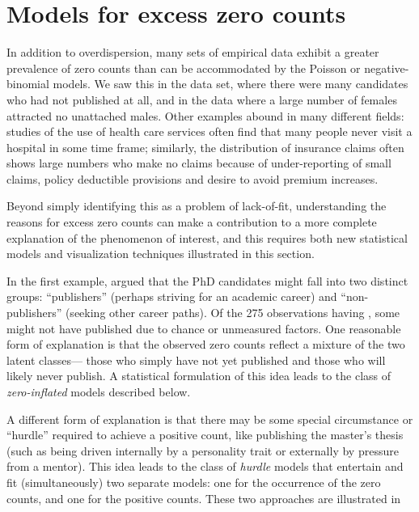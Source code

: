 \documentclass[11pt]{book}\usepackage[]{graphicx}\usepackage[]{color}
\begin{document}
\section{Models for excess zero counts}\label{sec:glm-zeros}


In addition to overdispersion, many sets of empirical data exhibit a greater prevalence of
zero counts than can be accommodated by the Poisson or negative-binomial models.
We saw this in the  data set, where there were many candidates who had
not published at all, and in the  data where a large number of
females attracted no unattached males.
Other examples abound in many different fields: studies of the
use of health care services often find that many people never visit a hospital
in some time frame; similarly, the distribution of insurance claims often shows
large numbers who make no claims \citep{YipYau:2005} because of under-reporting
of small claims, policy deductible provisions and desire to avoid premium increases.


Beyond simply identifying this as a problem of lack-of-fit,
understanding the reasons for excess zero counts can make a contribution to a
more complete explanation of the phenomenon of interest,
and this requires both new statistical models and visualization techniques
illustrated in this section.

In the first example, \citet{Long:1997} argued that the PhD candidates might fall into
two distinct groups: ``publishers'' (perhaps striving for an academic career)
and ``non-publishers'' (seeking other career paths).  Of the 275 observations
having , some might not have published due to chance or
unmeasured factors.  One reasonable form of explanation is that the observed
zero counts reflect a mixture of the two latent classes--- those who simply
have not yet published and those who will likely never publish.
A statistical formulation of this idea leads to the class of \emph{zero-inflated}
models described below.

A different form of explanation is that there may be some special
circumstance or ``hurdle'' required to achieve a positive count,
like publishing the master's thesis
(such as being driven internally by a personality trait or externally by
pressure from a mentor). This idea leads to the class of \emph{hurdle} models
that entertain and fit (simultaneously) two separate models: one for the
occurrence of the zero counts, and one for the positive counts.
These two approaches are illustrated in 
\end{document}
